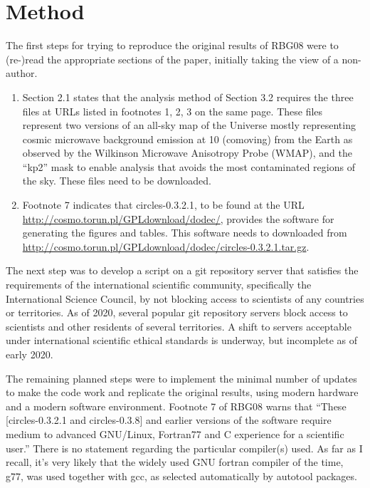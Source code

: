 \section{Method}

The first steps for trying to reproduce the original results
of RBG08 were to (re-)read the appropriate sections of the paper,
initially taking the view of a non-author.
\begin{enumerate}
\item
  Section 2.1\supercite{RBG08} states that the analysis method of
  Section 3.2 requires the three files at URLs listed in footnotes 1,
  2, 3 on the same page. These files represent two versions of an
  all-sky map of the Universe mostly representing cosmic microwave
  background emission at 10{\hGpc} (comoving) from the Earth as
  observed by the Wilkinson Microwave Anisotropy Probe
  (WMAP)\supercite{WMAP5Hinshaw}, and the ``kp2'' mask to enable
  analysis that avoids the most contaminated regions of the sky. These
  files need to be downloaded.
\item
  Footnote 7\supercite{RBG08} indicates that {\sc circles-0.3.2.1}, to
  be found at the URL \url{http://cosmo.torun.pl/GPLdownload/dodec/},
  provides the software for generating the figures and tables. This
  software needs to downloaded from
  \url{http://cosmo.torun.pl/GPLdownload/dodec/circles-0.3.2.1.tar.gz}.
\end{enumerate}

The next step was to develop a script on a {\sc git} repository server
that satisfies the requirements of the international scientific
community, specifically the International Science
Council\supercite{ISCFreedoms}, by not blocking access to scientists
of any countries or territories.  As of 2020, several popular {\sc
  git} repository servers block access to scientists and other
residents of several territories\supercite{Github2020}. A shift to
servers acceptable under international scientific ethical standards is
underway, but incomplete as of early 2020.

The remaining planned steps were to implement the minimal number of
updates to make the code work and replicate the original results,
using modern hardware and a modern software environment. Footnote 7 of
RBG08 warns that ``These [{\sc circles-0.3.2.1} and {\sc
    circles-0.3.8}] and earlier versions of the software require
medium to advanced {\sc GNU/Linux}, {\sc Fortran77} and {\sc C}
experience for a scientific user.'' There is no statement regarding
the particular compiler(s) used.  As far as I recall, it's very likely
that the widely used GNU fortran compiler of the time, {\sc g77}, was
used together with {\sc gcc}, as selected automatically by {\sc
  autotool} packages.

